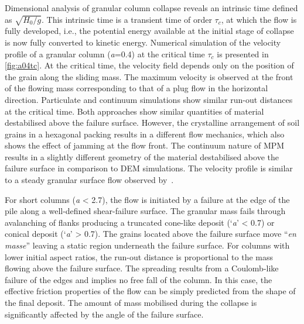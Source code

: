 Dimensional analysis of granular column collapse reveals an intrinsic time 
defined as $\sqrt{H_{0}/g}$. This intrinsic time is a transient time 
of order $\tau_{c}$, at which the flow is fully developed, i.e., the potential 
energy available at the initial stage of collapse is now fully converted to 
kinetic energy. Numerical simulation of the velocity profile of a granular 
column (\textit{a}=0.4) at the critical time $\tau_{c}$ is presented in 
\cref{fig:a04tc}. At the critical time, the velocity field depends only on the 
position of the grain along the sliding mass. The maximum velocity is observed 
at the front of the flowing mass corresponding to that of a plug flow in the 
horizontal direction. Particulate and continuum simulations show similar 
run-out distances at the critical time. Both approaches show similar quantities 
of material 
destabilised above the failure surface. However, the crystalline arrangement of 
soil grains in a hexagonal packing results in a different flow mechanics, which 
also shows the effect of jamming at the flow front. The continuum nature of MPM 
results in a slightly different geometry of the material destabilised above the 
failure surface in comparison to DEM simulations. The velocity profile is 
similar to a steady granular surface flow observed by~\citet{Lajeunesse2004}. 


For short columns (\textit{a} < 2.7), the flow is initiated 
by a failure at the edge of the pile along a well-defined shear-failure surface.
The granular mass fails through avalanching of flanks producing a 
truncated cone-like deposit (`\textit{a}' < 0.7) or conical deposit 
(`\textit{a}' > 0.7). The grains located above the failure surface move 
``\textit{en masse}'' leaving a static region underneath the failure surface. 
For columns with lower initial aspect ratios, the run-out distance is 
proportional to the mass flowing above the failure surface. The spreading 
results from a Coulomb-like failure of the edges and implies no free fall of 
the column. In this case, the effective friction 
properties of the flow can be simply predicted from the shape of the final 
deposit. The amount of mass mobilised during the collapse is significantly 
affected by the angle of the failure surface.

